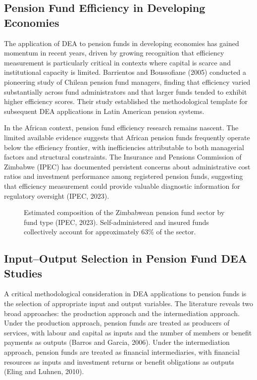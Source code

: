 \documentclass[12pt,a4paper]{article}
\begin{document}
\subsection{Pension Fund Efficiency in Developing Economies}

The application of DEA to pension funds in developing economies has gained momentum in recent years, driven by growing recognition that efficiency measurement is particularly critical in contexts where capital is scarce and institutional capacity is limited. Barrientos and Boussofiane (2005) conducted a pioneering study of Chilean pension fund managers, finding that efficiency varied substantially across fund administrators and that larger funds tended to exhibit higher efficiency scores. Their study established the methodological template for subsequent DEA applications in Latin American pension systems.

In the African context, pension fund efficiency research remains nascent. The limited available evidence suggests that African pension funds frequently operate below the efficiency frontier, with inefficiencies attributable to both managerial factors and structural constraints. The Insurance and Pensions Commission of Zimbabwe (IPEC) has documented persistent concerns about administrative cost ratios and investment performance among registered pension funds, suggesting that efficiency measurement could provide valuable diagnostic information for regulatory oversight (IPEC, 2023).

\begin{figure}[H]
\centering
{}
\caption{Estimated composition of the Zimbabwean pension fund sector by fund type (IPEC, 2023). Self-administered and insured funds collectively account for approximately 63\% of the sector.}
\label{fig:zim_composition}
\end{figure}

\subsection{Input--Output Selection in Pension Fund DEA Studies}

A critical methodological consideration in DEA applications to pension funds is the selection of appropriate input and output variables. The literature reveals two broad approaches: the production approach and the intermediation approach. Under the production approach, pension funds are treated as producers of services, with labour and capital as inputs and the number of members or benefit payments as outputs (Barros and Garcia, 2006). Under the intermediation approach, pension funds are treated as financial intermediaries, with financial resources as inputs and investment returns or benefit obligations as outputs (Eling and Luhnen, 2010).
\end{document}
